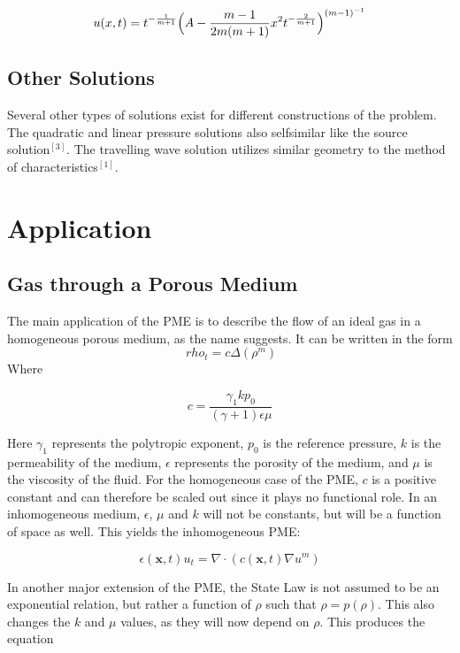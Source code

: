 \documentclass[paper=a4, fontsize=12pt]{scrartcl} %
\numberwithin{equation}{section} %
\numberwithin{table}{section} %
\begin{document}
\begin{equation}
    u(x,t) = t^{-\frac{1}{m+1}}\Big{(} A - \frac{m-1}{2m(m+1)}x^2t^{-\frac{2}{m+1}}\Big{)}^{(m-1)^{-1}}
\end{equation}

\subsection{Other Solutions}

Several other types of solutions exist for different constructions of the problem. The quadratic and linear pressure solutions also selfsimilar like the source solution$^{[3]}$. The travelling wave solution utilizes similar geometry to the method of characteristics$^{[1]}$.

\section{Application}
\subsection{Gas through a Porous Medium}
The main application of the PME is to describe the flow of an ideal gas in a homogeneous porous medium, as the name suggests. It can be written in the form 
\begin{equation}
\	rho_t = c \Delta (\rho^m)
\end{equation}
Where 

\begin{equation}
	c= \frac{\gamma_1 kp_0}{(\gamma +1 )\epsilon\mu}
\end{equation}

Here $\gamma_1$ represents the polytropic exponent, $p_0$ is the reference pressure, $k$ is the permeability of the medium, $\epsilon$ represents the porosity of the medium, and $\mu$ is the viscosity of the fluid.
For the homogeneous case of the PME, $c$ is a positive constant and can therefore be scaled out since it plays no functional role. In an inhomogeneous medium,  $\epsilon$, $\mu$ and $k$ will not be constants, but will be a function of space as well. This yields the inhomogeneous PME:

\begin{equation}
	\epsilon(\mathbf{x},t) u_t = \nabla \cdot(c(\mathbf{x},t)\nabla u^m) 
\end{equation}


In another major extension of the PME, the State Law is not assumed to be an exponential relation, but rather a function of $\rho$ such that $\rho = p(\rho)$. This also changes the $k$ and $\mu$ values, as they will now depend on $\rho$. This produces the equation
\end{document}
